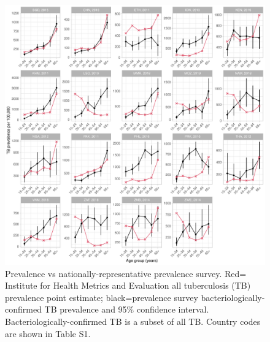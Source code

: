 \documentclass[12pt]{article}
\begin{document}
\begin{figure}
\centering
\includegraphics[width=1\textwidth]{../plots/aF3.pdf}
\caption[Prevalence vs prevalence survey.]{Prevalence vs
  nationally-representative prevalence survey. Red= Institute for Health Metrics
  and Evaluation all tuberculosis (TB) prevalence point
  estimate; black=prevalence survey bacteriologically-confirmed TB prevalence
  and 95\% confidence interval. Bacteriologically-confirmed TB is a subset of
  all TB. Country codes are shown in Table S1.}
\end{figure}

\FloatBarrier
\end{document}
